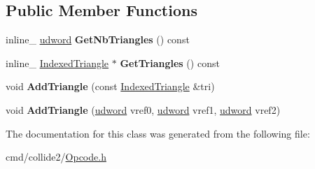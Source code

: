 \subsection*{Public Member Functions}
\begin{DoxyCompactItemize}
\item 
inline\+\_\+ \hyperlink{IceTypes_8h_a44c6f1920ba5551225fb534f9d1a1733}{udword} {\bfseries Get\+Nb\+Triangles} () const \hypertarget{classOpcode_1_1TriangleList_ae656fa9dfb0a434f3b92eba87c43ef27}{}\label{classOpcode_1_1TriangleList_ae656fa9dfb0a434f3b92eba87c43ef27}

\item 
inline\+\_\+ \hyperlink{classOpcode_1_1IndexedTriangle}{Indexed\+Triangle} $\ast$ {\bfseries Get\+Triangles} () const \hypertarget{classOpcode_1_1TriangleList_a0fa2d32d86b9eec44c89eb660ea3d798}{}\label{classOpcode_1_1TriangleList_a0fa2d32d86b9eec44c89eb660ea3d798}

\item 
void {\bfseries Add\+Triangle} (const \hyperlink{classOpcode_1_1IndexedTriangle}{Indexed\+Triangle} \&tri)\hypertarget{classOpcode_1_1TriangleList_a5a703dfc71f8ec1066389d7b462b5c22}{}\label{classOpcode_1_1TriangleList_a5a703dfc71f8ec1066389d7b462b5c22}

\item 
void {\bfseries Add\+Triangle} (\hyperlink{IceTypes_8h_a44c6f1920ba5551225fb534f9d1a1733}{udword} vref0, \hyperlink{IceTypes_8h_a44c6f1920ba5551225fb534f9d1a1733}{udword} vref1, \hyperlink{IceTypes_8h_a44c6f1920ba5551225fb534f9d1a1733}{udword} vref2)\hypertarget{classOpcode_1_1TriangleList_a9a4211b1a6f2f4e5dc6e21672eb472a1}{}\label{classOpcode_1_1TriangleList_a9a4211b1a6f2f4e5dc6e21672eb472a1}

\end{DoxyCompactItemize}


The documentation for this class was generated from the following file\+:\begin{DoxyCompactItemize}
\item 
cmd/collide2/\hyperlink{Opcode_8h}{Opcode.\+h}\end{DoxyCompactItemize}

